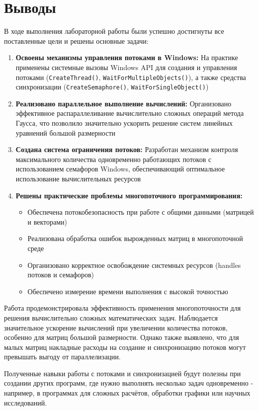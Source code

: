 \section{Выводы}

В ходе выполнения лабораторной работы были успешно достигнуты все поставленные цели и решены основные задачи:

\begin{enumerate}
    \item \textbf{Освоены механизмы управления потоками в Windows:} На практике применены системные вызовы Windows API для создания и управления потоками (\texttt{CreateThread()}, \texttt{WaitForMultipleObjects()}), а также средства синхронизации (\texttt{CreateSemaphore()}, \texttt{WaitForSingleObject()})
    
    \item \textbf{Реализовано параллельное выполнение вычислений:} Организовано эффективное распараллеливание вычислительно сложных операций метода Гаусса, что позволило значительно ускорить решение систем линейных уравнений большой размерности
    
    \item \textbf{Создана система ограничения потоков:} Разработан механизм контроля максимального количества одновременно работающих потоков с использованием семафоров Windows, обеспечивающий оптимальное использование вычислительных ресурсов
    
    \item \textbf{Решены практические проблемы многопоточного программирования:} 
    \begin{itemize}
        \item Обеспечена потокобезопасность при работе с общими данными (матрицей и векторами)
        \item Реализована обработка ошибок вырожденных матриц в многопоточной среде
        \item Организовано корректное освобождение системных ресурсов (handles потоков и семафоров)
        \item Обеспечено измерение времени выполнения с высокой точностью
    \end{itemize}
\end{enumerate}

Работа продемонстрировала эффективность применения многопоточности для решения вычислительно сложных математических задач. Наблюдается значительное ускорение вычислений при увеличении количества потоков, особенно для матриц большой размерности. Однако также выявлено, что для малых матриц накладные расходы на создание и синхронизацию потоков могут превышать выгоду от параллелизации.

Полученные навыки работы с потоками и синхронизацией будут полезны при создании других программ, где нужно выполнять несколько задач одновременно - например, в программах для сложных расчётов, обработки графики или научных исследований.

\pagebreak